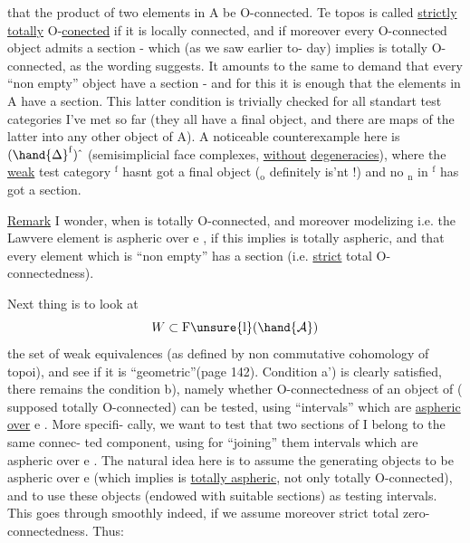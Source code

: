 
that the product of two elements in A be O-connected.  Te topos is called
\uline{strictly} \uline{totally} O-\uline{conected}  if it is locally connected,  and if moreover
every O-connected object admits a section  -  which (as we saw earlier to-%
day) implies  is totally O-connected,  as the wording suggests.  It
amounts to the same to demand that every ``non empty'' object have a section
-  and for this it is enough that the elements in A have a section.  This
latter condition is trivially checked for all standart test categories
I've met so far  (they all have a final object,  and there are maps of the
latter into any other object of A).  A noticeable counterexample here is
$(\hand{\Delta}^{\mathrm{f}})\hat{\ }$ (semisimplicial face complexes,  \uline{without} \uline{degeneracies}),  where 
the \uline{weak} test category \hand{$\Delta$}$^{\mathrm{f}}$ hasnt got a final object  (\hand{$\Delta$}$_{\mathrm{o}}$ definitely
 is'nt !)  and no \hand{$\Delta$}$_{\mathrm{n}}$ in \hand{$\Delta$}$^{\mathrm{f}}$  has got a section.

\uline{Remark}  I wonder,  when  is totally O-connected, and moreover modelizing
i.e. the Lawvere element is aspheric over e ,  if this implies  is
totally aspheric,  and that every element  which is ``non empty'' has a
section (i.e. \uline{strict} total O-connectedness).  

Next thing is to look at
\[ W \subset \mathrm{F}\unsure{\mathrm{l}}(\hand{\mathcal{A}}) \]
the set of weak equivalences (as defined by non commutative cohomology
of topoi),  and see if it is ``geometric''(page 142).  Condition a') is 
clearly satisfied,  there remains the condition b),  namely whether
O-connectedness of an object of  ( supposed totally O-connected) can
be tested,  using ``intervals'' which are \uline{aspheric over} e .  More specifi-%
cally,  we want to test that two sections of I belong to the same connec-%
ted component,  using for ``joining'' them intervals which are aspheric
over e .  The natural idea here is to assume the generating objects 
to be aspheric over e (which implies  is \uline{totally aspheric},  not only
totally O-connected),  and to use these objects (endowed with suitable
sections) as testing intervals.  This goes through smoothly indeed,  if
we assume  moreover strict total zero-connectedness.  Thus:

